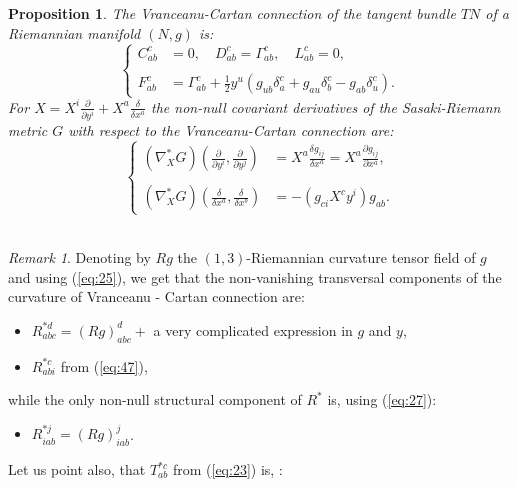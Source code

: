 \documentclass[11pt,oneside,english]{amsart}
\numberwithin{equation}{section}
\numberwithin{figure}{section}
\theoremstyle{plain}
\theoremstyle{definition}
\theoremstyle{definition}
\theoremstyle{plain}
\newtheorem{prop}[thm]{Proposition}
\theoremstyle{plain}
\theoremstyle{remark}
\theoremstyle{remark}
\newtheorem{rem}[thm]{Remark}
\begin{document}
\begin{prop}
The Vranceanu-Cartan connection of the tangent bundle $TN$ of a Riemannian
manifold $(N,g)$ is: \begin{equation}
\left\{ \begin{array}{ll}
C_{ab}^{c} & =0,\quad D_{ab}^{c}=\Gamma_{ab}^{c},\quad L_{ab}^{c}=0,\\
\\F_{ab}^{c} & =\Gamma_{ab}^{c}+\frac{1}{2}y^{u}\left(g_{ub}\delta_{a}^{c}+g_{au}\delta_{b}^{c}-g_{ab}\delta_{u}^{c}\right).\end{array}\right.\label{eq:48}\end{equation}
 For $X=X^{i}\frac{\partial}{\partial y^{i}}+X^{a}\frac{\delta}{\delta x^{a}}$
the non-null covariant derivatives of the Sasaki-Riemann metric $G$
with respect to the Vranceanu-Cartan connection are: \begin{equation}
\left\{ \begin{array}{ll}
(\nabla_{X}^{*}G)(\frac{\partial}{\partial y^{i}},\frac{\partial}{\partial y^{j}}) & =X^{a}\frac{\delta g_{ij}}{\delta x^{a}}=X^{a}\frac{\partial g_{ij}}{\partial x^{a}},\\
\\(\nabla_{X}^{*}G)(\frac{\delta}{\delta x^{a}},\frac{\delta}{\delta x^{b}}) & =-(g_{ci}X^{c}y^{i})g_{ab}.\end{array}\right.\label{eq:49}\end{equation}
\\

\end{prop}
\begin{rem}
Denoting by $Rg$ the $(1,3)$-Riemannian curvature tensor field of
$g$ and using (\ref{eq:25}), we get that the non-vanishing transversal
components of the curvature of Vranceanu - Cartan connection are: 
\end{rem}
\begin{itemize}
\item $R_{abc}^{*d}=(Rg)_{abc}^{d}+$ a very complicated expression in $g$
and $y$, \\

\item $R_{abi}^{*c}$ from (\ref{eq:47}), 
\end{itemize}
while the only non-null structural component of $R^{*}$ is, using
(\ref{eq:27}):

\begin{itemize}
\item $R_{iab}^{*j}=(Rg)_{iab}^{j}$. \\

\end{itemize}
Let us point also, that $T_{ab}^{*c}$ from (\ref{eq:23}) is, \cite[p. 233]{b:f}:
\end{document}

